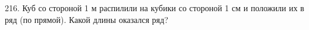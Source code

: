 216. Куб со стороной 1 м распилили на кубики со стороной 1 см и положили их в ряд (по прямой). Какой длины оказался ряд?\\
